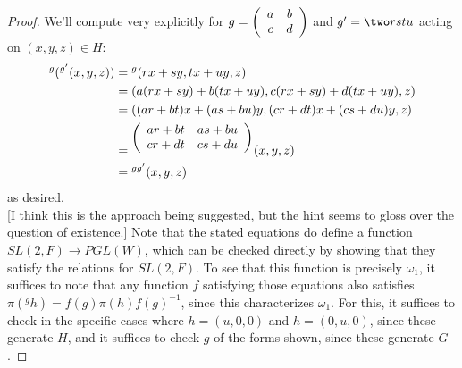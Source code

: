 \begin{proof}
	We'll compute very explicitly for $g = \left(\begin{array}{cc} a & b \\ c & d \end{array}\right)$ and $g' = \two rstu$ acting on $(x,y,z) \in H$:
	\begin{align*}
	{}^g({}^{g'}(x,y,z))
		&= {}^g(rx+sy,tx+uy,z) \\
		&= (a(rx+sy)+b(tx+uy),c(rx+sy)+d(tx+uy),z) \\
		&= ((ar+bt)x+(as+bu)y,(cr+dt)x+(cs+du)y,z) \\
		&= {}^{\left(\begin{array}{cc} ar+bt & as+bu \\ cr+dt & cs+du \end{array}\right)}(x,y,z) \\
		&= {}^{gg'}(x,y,z)
	\end{align*}
	as desired. \\
	
	[I think this is the approach being suggested, but the hint seems to gloss over the question of existence.] Note that the stated equations do define a function $SL(2,F) \to PGL(W)$, which can be checked directly by showing that they satisfy the relations for $SL(2,F)$. To see that this function is precisely $\omega_1$, it suffices to note that any function $f$ satisfying those equations also satisfies $\pi(^gh) = f(g)\pi(h)f(g)^{-1}$, since this characterizes $\omega_1$. For this, it suffices to check in the specific cases where $h = (u,0,0)$ and $h = (0,u,0)$, since these generate $H$, and it suffices to check $g$ of the forms shown, since these generate $G$.
	

\end{proof}

